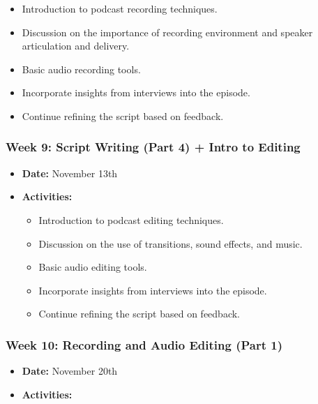 \documentclass[
  letterpaper,
  DIV=11,
  numbers=noendperiod]{scrreprt}
\providecommand{\tightlist}{%
  \setlength{\itemsep}{0pt}\setlength{\parskip}{0pt}}\usepackage{longtable,booktabs,array}
\begin{document}
\begin{tcolorbox}
\begin{itemize}
  \begin{itemize}
  \tightlist
  \item
    Introduction to podcast recording techniques.
  \item
    Discussion on the importance of recording environment and speaker
    articulation and delivery.
  \item
    Basic audio recording tools.
  \item
    Incorporate insights from interviews into the episode.
  \item
    Continue refining the script based on feedback.
  \end{itemize}
\end{itemize}

\subsubsection{Week 9: Script Writing (Part 4) + Intro to
Editing}\label{week-9-script-writing-part-4-intro-to-editing}

\begin{itemize}
\tightlist
\item
  \textbf{Date:} November 13th
\item
  \textbf{Activities:}

  \begin{itemize}
  \tightlist
  \item
    Introduction to podcast editing techniques.
  \item
    Discussion on the use of transitions, sound effects, and music.
  \item
    Basic audio editing tools.
  \item
    Incorporate insights from interviews into the episode.
  \item
    Continue refining the script based on feedback.
  \end{itemize}
\end{itemize}

\subsubsection{Week 10: Recording and Audio Editing (Part
1)}\label{week-10-recording-and-audio-editing-part-1}

\begin{itemize}
\tightlist
\item
  \textbf{Date:} November 20th
\item
  \textbf{Activities:}


\end{itemize}
\end{tcolorbox}
\end{document}
